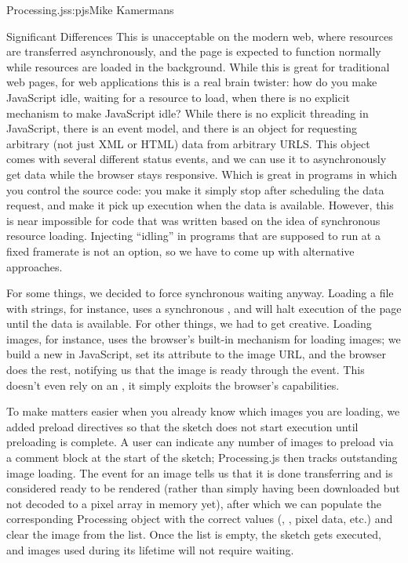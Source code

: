 \begin{aosachapter}{Processing.js}{s:pjs}{Mike Kamermans}
\begin{aosasect1}{Significant Differences}
This is unacceptable on the modern web, where resources are
transferred asynchronously, and the page is expected to function
normally while resources are loaded in the background. While this is
great for traditional web pages, for web applications this is a real
brain twister: how do you make JavaScript idle, waiting for a resource
to load, when there is no explicit mechanism to make JavaScript idle?
While there is no explicit threading in JavaScript, there is an event
model, and there is an  object for requesting arbitrary
(not just XML or HTML) data from arbitrary URLS. This object comes
with several different status events, and we can use it to
asynchronously get data while the browser stays responsive. Which is
great in programs in which you control the source code: you make it
simply stop after scheduling the data request, and make it pick up
execution when the data is available. However, this is near impossible
for code that was written based on the idea of synchronous resource
loading. Injecting ``idling'' in programs that are supposed to run at a
fixed framerate is not an option, so we have to come up with
alternative approaches.

For some things, we decided to force synchronous waiting
anyway. Loading a file with strings, for instance, uses a synchronous
, and will halt execution of the page until the data is
available. For other things, we had to get creative. Loading images,
for instance, uses the browser's built-in mechanism for loading
images; we build a new  in JavaScript, set its 
attribute to the image URL, and the browser does the rest, notifying
us that the image is ready through the  event. This
doesn't even rely on an , it simply exploits the
browser's capabilities.

To make matters easier when you already know which images you are
loading, we added preload directives so that the sketch does not start
execution until preloading is complete. A user can indicate any number
of images to preload via a comment block at the start of the sketch;
Processing.js then tracks outstanding image loading. The 
event for an image tells us that it is done transferring and is
considered ready to be rendered (rather than simply having been
downloaded but not decoded to a pixel array in memory yet), after
which we can populate the corresponding Processing 
object with the correct values (, , pixel
data, etc.) and clear the image from the list. Once the list is empty,
the sketch gets executed, and images used during its lifetime will not
require waiting.


\end{aosasect1}
\end{aosachapter}
